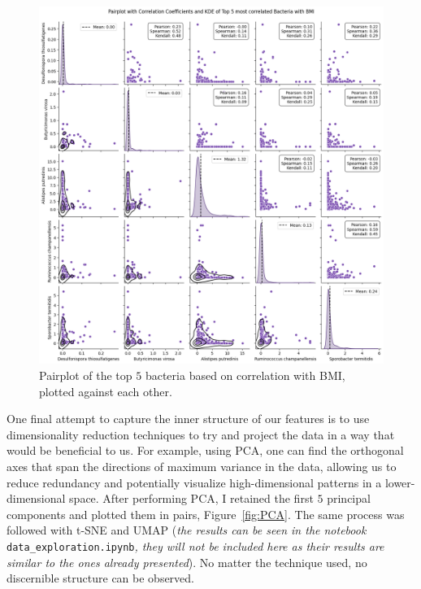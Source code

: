 \documentclass[12pt]{article}
\begin{document}
\begin{figure}[H]
    \centering
    \includegraphics[width=\textwidth]{ims/corr_coeffs_top_5.png}
    \caption{Pairplot of the top $5$ bacteria based on correlation with BMI, plotted
    against each other.}
    \label{fig:corrs_top_5}
\end{figure}

One final attempt to capture the inner structure of our features is to use
dimensionality reduction techniques to try and project the data in a way that
would be beneficial to us. For example, using PCA, one can find the orthogonal
axes that span the directions of maximum variance in the data, allowing us to
reduce redundancy and potentially visualize high-dimensional patterns in a
lower-dimensional space. After performing PCA, I retained the first $5$ principal
components and plotted them in pairs, Figure~\ref{fig:PCA}. The same process
was followed with t-SNE and UMAP (\textit{the results can be seen in the notebook}
\texttt{data\_exploration.ipynb}\textit{, they will not be included here as their
results are similar to the ones already presented}). No matter the technique used,
no discernible structure can be observed.
\end{document}
